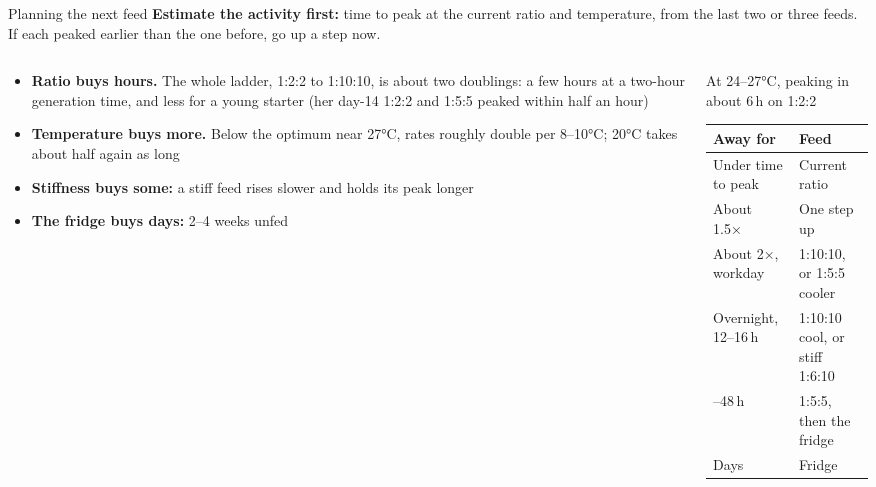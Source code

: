 \documentclass[aspectratio=169,11pt]{beamer}
\begin{document}
\begin{frame}{Planning the next feed \hypothesis}
  \scriptsize
  \textbf{\color{crust}Estimate the activity first:} time to peak at the current ratio and temperature, from the last two or three feeds. If each peaked earlier than the one before, go up a step now.
  \begin{columns}[T]
    \begin{column}{0.5\textwidth}
      \scriptsize
      \begin{itemize}\setlength{\itemsep}{1pt}
        \item \textbf{Ratio buys hours.} The whole ladder, 1:2:2 to 1:10:10, is about two doublings: a few hours at a two-hour generation time, and less for a young starter (her day-14 1:2:2 and 1:5:5 peaked within half an hour)
        \item \textbf{Temperature buys more.} Below the optimum near 27°C, rates roughly double per 8--10°C; 20°C takes about half again as long
        \item \textbf{Stiffness buys some:} a stiff feed rises slower and holds its peak longer
        \item \textbf{The fridge buys days:} 2--4 weeks unfed
      \end{itemize}
    \end{column}
    \begin{column}{0.46\textwidth}
      \scriptsize
      {\color{muted} At 24--27°C, peaking in about 6\,h on 1:2:2}\par\smallskip
      \begin{tabularx}{\linewidth}{@{}>{\raggedright\arraybackslash}p{2.5cm} X@{}}
        \toprule
        \textbf{Away for} & \textbf{Feed} \\
        \midrule
        Under time to peak & Current ratio \\
        About 1.5× & One step up \\
        About 2×, workday & 1:10:10, or 1:5:5 cooler \\
        Overnight, 12--16\,h & 1:10:10 cool, or stiff 1:6:10 \\
        24--48\,h & 1:5:5, then the fridge \\
        Days & Fridge \\
        \bottomrule
      \end{tabularx}
    \end{column}
  \end{columns}
\end{frame}
\end{document}
